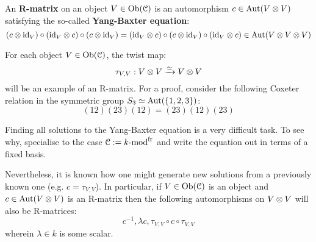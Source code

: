         \begin{definition}[R-matrices] \label{def: R_matrices}
            An \textbf{R-matrix} on an object $V \in \mathrm{Ob}(\mathcal{C})$ is an automorphism $c \in \Aut(V \tensor V)$ satisfying the so-called \textbf{Yang-Baxter equation}:
                $$(c \tensor \id_V) \circ (\id_V \tensor c) \circ (c \tensor \id_V) = (\id_V \tensor c) \circ (c \tensor \id_V) \circ (\id_V \tensor c) \in \Aut(V \tensor V \tensor V)$$
        \end{definition}
        \begin{example}
            For each object $V \in \mathrm{Ob}(\mathcal{C})$, the twist map:
                $$\tau_{V, V}: V \tensor V \xrightarrow[]{\cong} V \tensor V$$
            will be an example of an R-matrix. For a proof, consider the following Coxeter relation in the symmetric group $S_3 \simeq \mathrm{Aut}(\{1, 2, 3\})$:
                $$(12)(23)(12) = (23)(12)(23)$$    
        \end{example}
        \begin{remark}
            Finding all solutions to the Yang-Baxter equation is a very difficult task. To see why, specialise to the case $\mathcal{C} := k\text{-}\mathrm{mod}^{\mathrm{fr}}$ and write the equation out in terms of a fixed basis. 
            
            Nevertheless, it is known how one might generate new solutions from a previously known one (e.g. $c = \tau_{V, V}$). In particular, if $V \in \mathrm{Ob}(\mathcal{C})$ is an object and $c \in \Aut(V \tensor V)$ is an R-matrix then the following automorphisms on $V \tensor V$ will also be R-matrices:
                $$c^{-1}, \lambda c, \tau_{V, V} \circ c \circ \tau_{V, V}$$
            wherein $\lambda \in k$ is some scalar.
        \end{remark}
